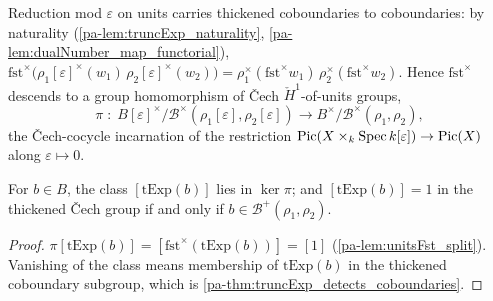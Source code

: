 \begin{definition}
  \label{pa-def:cech_units_reduction}
  \leanok

  Reduction mod \(\varepsilon\) on units carries thickened coboundaries to
  coboundaries: by naturality (\ref{pa-lem:truncExp_naturality},
  \ref{pa-lem:dualNumber_map_functorial}),
  \(\mathrm{fst}^\times\bigl(\rho_1[\varepsilon]^\times(w_1)\,
  \rho_2[\varepsilon]^\times(w_2)\bigr) =
  \rho_1^\times(\mathrm{fst}^\times w_1)\, \rho_2^\times(\mathrm{fst}^\times w_2)\).
  Hence \(\mathrm{fst}^\times\) descends to a group homomorphism of \v{C}ech
  \(\check H^1\)-of-units groups,
  \[
    \pi \;:\;
    B[\varepsilon]^\times \big/ \mathcal B^\times(\rho_1[\varepsilon],
      \rho_2[\varepsilon])
    \longrightarrow
    B^\times \big/ \mathcal B^\times(\rho_1, \rho_2),
  \]
  the \v{C}ech-cocycle incarnation of the restriction
  \(\operatorname{Pic}(X \times_k \operatorname{Spec} k[\varepsilon]) \to \operatorname{Pic}(X)\) along
  \(\varepsilon \mapsto 0\).
\end{definition}

\begin{lemma}
  \label{pa-lem:cech_kernel_truncExp_class}
  \leanok

  For \(b \in B\), the class \([\mathrm{tExp}(b)]\) lies in \(\ker \pi\); and
  \([\mathrm{tExp}(b)] = 1\) in the thickened \v{C}ech group if and only if
  \(b \in \mathcal B^+(\rho_1, \rho_2)\).
\end{lemma}
\begin{proof}
  \leanok
  \(\pi[\mathrm{tExp}(b)] = [\mathrm{fst}^\times(\mathrm{tExp}(b))] = [1]\)
  (\ref{pa-lem:unitsFst_split}). Vanishing of the class means membership of
  \(\mathrm{tExp}(b)\) in the thickened coboundary subgroup, which is
  \ref{pa-thm:truncExp_detects_coboundaries}.
\end{proof}

